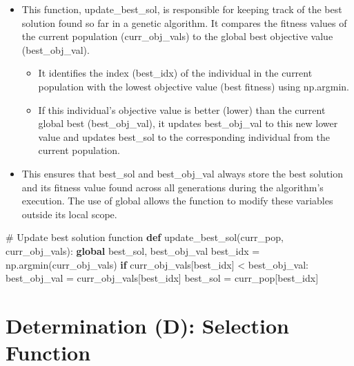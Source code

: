 \documentclass[
  letterpaper,
  DIV=11,
  numbers=noendperiod]{scrreprt}
\newenvironment{Shaded}{\begin{snugshade}}{\end{snugshade}}
\newcommand{\CommentTok}[1]{\textcolor[rgb]{0.37,0.37,0.37}{#1}}
\newcommand{\ControlFlowTok}[1]{\textcolor[rgb]{0.00,0.23,0.31}{\textbf{#1}}}
\newcommand{\KeywordTok}[1]{\textcolor[rgb]{0.00,0.23,0.31}{\textbf{#1}}}
\newcommand{\NormalTok}[1]{\textcolor[rgb]{0.00,0.23,0.31}{#1}}
\newcommand{\OperatorTok}[1]{\textcolor[rgb]{0.37,0.37,0.37}{#1}}
\providecommand{\tightlist}{%
  \setlength{\itemsep}{0pt}\setlength{\parskip}{0pt}}\usepackage{longtable,booktabs,array}
\begin{document}
\begin{itemize}
\tightlist
\item
  This function, update\_best\_sol, is responsible for keeping track of
  the best solution found so far in a genetic algorithm. It compares the
  fitness values of the current population (curr\_obj\_vals) to the
  global best objective value (best\_obj\_val).

  \begin{itemize}
  \tightlist
  \item
    It identifies the index (best\_idx) of the individual in the current
    population with the lowest objective value (best fitness) using
    np.argmin.
  \item
    If this individual's objective value is better (lower) than the
    current global best (best\_obj\_val), it updates best\_obj\_val to
    this new lower value and updates best\_sol to the corresponding
    individual from the current population.
  \end{itemize}
\item
  This ensures that best\_sol and best\_obj\_val always store the best
  solution and its fitness value found across all generations during the
  algorithm's execution. The use of global allows the function to modify
  these variables outside its local scope.
\end{itemize}

\begin{Shaded}
\begin{Highlighting}[]
\CommentTok{\# Update best solution function}
\KeywordTok{def}\NormalTok{ update\_best\_sol(curr\_pop, curr\_obj\_vals):}
    \KeywordTok{global}\NormalTok{ best\_sol, best\_obj\_val}
\NormalTok{    best\_idx }\OperatorTok{=}\NormalTok{ np.argmin(curr\_obj\_vals)}
    \ControlFlowTok{if}\NormalTok{ curr\_obj\_vals[best\_idx] }\OperatorTok{\textless{}}\NormalTok{ best\_obj\_val:}
\NormalTok{        best\_obj\_val }\OperatorTok{=}\NormalTok{ curr\_obj\_vals[best\_idx]}
\NormalTok{        best\_sol }\OperatorTok{=}\NormalTok{ curr\_pop[best\_idx]}
\end{Highlighting}
\end{Shaded}

\section{Determination (D): Selection
Function}\label{determination-d-selection-function}
\end{document}
